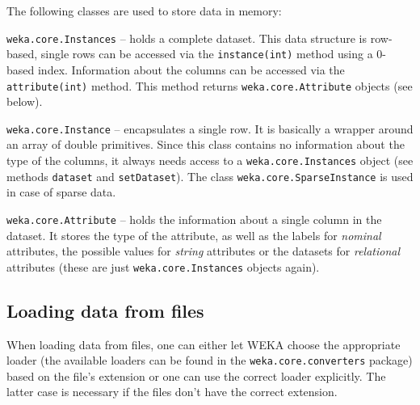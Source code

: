 The following classes are used to store data in memory:
\begin{tight_itemize}
	\item \texttt{weka.core.Instances} -- holds a complete dataset. This data
structure is row-based, single rows can be accessed via the
\texttt{instance(int)} method using a 0-based index. Information about the
columns can be accessed via the \texttt{attribute(int)} method. This method
returns \texttt{weka.core.Attribute} objects (see below).
	\item \texttt{weka.core.Instance} -- encapsulates a single row. It is
basically a wrapper around an array of double primitives. Since this class
contains no information about the type of the columns, it always needs access
to a \texttt{weka.core.Instances} object (see methods \texttt{dataset} and
\texttt{setDataset}). The class \texttt{weka.core.SparseInstance} is used in
case of sparse data.
	\item \texttt{weka.core.Attribute} -- holds the information about a single
column in the dataset. It stores the type of the attribute, as well as the
labels for \textit{nominal} attributes, the possible values for \textit{string}
attributes or the datasets for \textit{relational} attributes (these are just
\texttt{weka.core.Instances} objects again).
\end{tight_itemize}

\subsection{Loading data from files}
When loading data from files, one can either let WEKA choose the appropriate
loader (the available loaders can be found in the \texttt{weka.core.converters}
package) based on the file's extension or one can use the correct loader
explicitly. The latter case is necessary if the files don't have the correct
extension.


